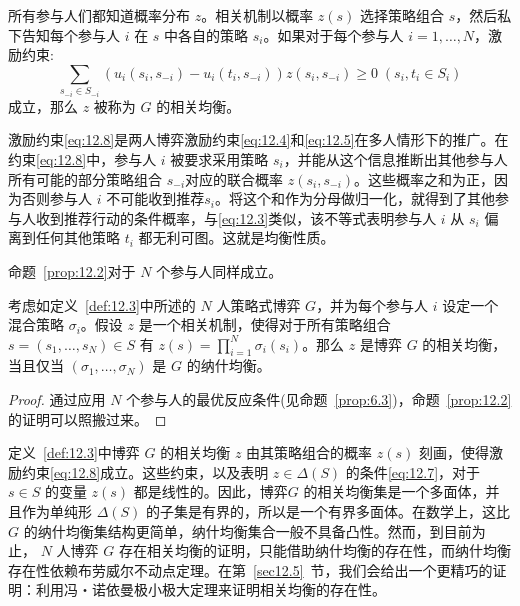 所有参与人们都知道概率分布 \(z\)。相关机制以概率 \(z\left( s\right)\) 选择策略组合 \(s\)，然后私下告知每个参与人 \(i\) 在 \(s\) 中各自的策略 \({s}_{i}\)。如果对于每个参与人 \(i = 1,\ldots ,N\)，激励约束:
\begin{equation}
\mathop{\sum }\limits_{{{s}_{-i} \in  {S}_{-i}}}\left( {{u}_{i}\left( {{s}_{i},{s}_{-i}}\right)  - {u}_{i}\left( {{t}_{i},{s}_{-i}}\right) }\right) z\left( {{s}_{i},{s}_{-i}}\right)  \geq  0\;\left( {{s}_{i},{t}_{i} \in  {S}_{i}}\right)  \label{eq:12.8}
\end{equation}
成立，那么 \(z\) 被称为 \(G\) 的相关均衡。

激励约束\eqref{eq:12.8}是两人博弈激励约束\eqref{eq:12.4}和\eqref{eq:12.5}在多人情形下的推广。在约束\eqref{eq:12.8}中，参与人 \(i\) 被要求采用策略 \({s}_{i}\)，并能从这个信息推断出其他参与人所有可能的部分策略组合 \({s}_{-i}\)对应的联合概率 \(z\left( {{s}_{i},{s}_{-i}}\right)\)。这些概率之和为正，因为否则参与人 \(i\) 不可能收到推荐\({s}_{i}\)。将这个和作为分母做归一化，就得到了其他参与人收到推荐行动的条件概率，与\eqref{eq:12.3}类似，该不等式表明参与人 \(i\) 从 \({s}_{i}\) 偏离到任何其他策略 \({t}_{i}\) 都无利可图。这就是均衡性质。

命题~\ref{prop:12.2}对于 \(N\) 个参与人同样成立。

\begin{proposition}\label{prop:12.4}
考虑如定义~\ref{def:12.3}中所述的 \(N\) 人策略式博弈 \(G\)，并为每个参与人 \(i\) 设定一个混合策略 \({\sigma }_{i}\)。假设 \(z\) 是一个相关机制，使得对于所有策略组合 \(s = \left( {{s}_{1},\ldots ,{s}_{N}}\right)  \in  S\) 有 \(z\left( s\right)  = \mathop{\prod }\limits_{{i = 1}}^{N}{\sigma }_{i}\left( {s}_{i}\right)\)。那么 \(z\) 是博弈 \(G\) 的相关均衡，当且仅当 \(\left( {{\sigma }_{1},\ldots,{\sigma }_{N}}\right)\) 是 \(G\) 的纳什均衡。
\end{proposition}

\begin{proof}
通过应用 \(N\) 个参与人的最优反应条件(见命题~\ref{prop:6.3})，命题~\ref{prop:12.2}的证明可以照搬过来。
\end{proof}

定义~\ref{def:12.3}中博弈 \(G\) 的相关均衡 \(z\) 由其策略组合的概率 \(z\left( s\right)\) 刻画，使得激励约束\eqref{eq:12.8}成立。这些约束，以及表明 \(z \in  \Delta \left( S\right)\) 的条件\eqref{eq:12.7}，对于 \(s \in  S\) 的变量 \(z\left( s\right)\) 都是线性的。因此，博弈\(G\) 的相关均衡集是一个多面体，并且作为单纯形 \(\Delta \left( S\right)\) 的子集是有界的，所以是一个有界多面体。在数学上，这比 \(G\) 的纳什均衡集结构更简单，纳什均衡集合一般不具备凸性。然而，到目前为止， \(N\) 人博弈 \(G\) 存在相关均衡的证明，只能借助纳什均衡的存在性，而纳什均衡存在性依赖布劳威尔不动点定理。在第~\ref{sec12.5}~节，我们会给出一个更精巧的证明：利用冯・诺依曼极小极大定理来证明相关均衡的存在性。

